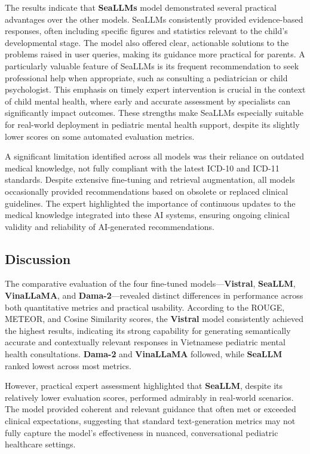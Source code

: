 \documentclass[runningheads]{llncs}
\begin{document}
The results indicate that \textbf{SeaLLMs} model demonstrated several practical advantages over the other models. SeaLLMs consistently provided evidence-based responses, often including specific figures and statistics relevant to the child's developmental stage. The model also offered clear, actionable solutions to the problems raised in user queries, making its guidance more practical for parents. A particularly valuable feature of SeaLLMs is its frequent recommendation to seek professional help when appropriate, such as consulting a pediatrician or child psychologist. This emphasis on timely expert intervention is crucial in the context of child mental health, where early and accurate assessment by specialists can significantly impact outcomes. These strengths make SeaLLMs especially suitable for real-world deployment in pediatric mental health support, despite its slightly lower scores on some automated evaluation metrics.

A significant limitation identified across all models was their reliance on outdated medical knowledge, not fully compliant with the latest ICD-10 and ICD-11 standards. Despite extensive fine-tuning and retrieval augmentation, all models occasionally provided recommendations based on obsolete or replaced clinical guidelines. The expert highlighted the importance of continuous updates to the medical knowledge integrated into these AI systems, ensuring ongoing clinical validity and reliability of AI-generated recommendations.

\subsection{Discussion}

The comparative evaluation of the four fine-tuned models—\textbf{Vistral}, \textbf{SeaLLM}, \textbf{VinaLLaMA}, and \textbf{Dama-2}—revealed distinct differences in performance across both quantitative metrics and practical usability. According to the ROUGE, METEOR, and Cosine Similarity scores, the \textbf{Vistral} model consistently achieved the highest results, indicating its strong capability for generating semantically accurate and contextually relevant responses in Vietnamese pediatric mental health consultations. \textbf{Dama-2} and \textbf{VinaLLaMA} followed, while \textbf{SeaLLM} ranked lowest across most metrics.

However, practical expert assessment highlighted that \textbf{SeaLLM}, despite its relatively lower evaluation scores, performed admirably in real-world scenarios. The model provided coherent and relevant guidance that often met or exceeded clinical expectations, suggesting that standard text-generation metrics may not fully capture the model's effectiveness in nuanced, conversational pediatric healthcare settings.
\end{document}
